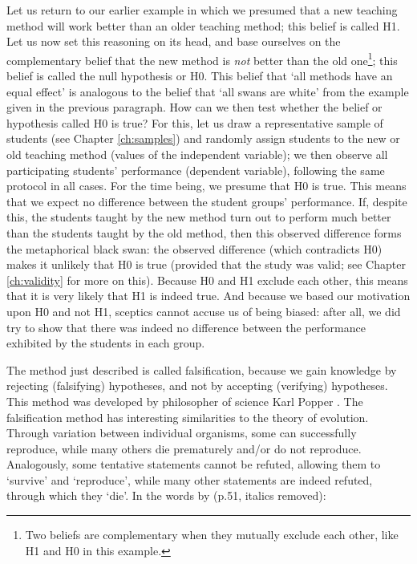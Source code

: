 \documentclass[
]{book}
\begin{document}
Let us return to our earlier example in which we presumed that a new teaching method will work better than an older teaching method; this belief is called H1. Let us now set this reasoning on its head, and base ourselves on the complementary belief that the new method is \emph{not} better than the old one\footnote{Two beliefs are complementary when they mutually exclude each other, like H1 and H0 in this example.}; this belief is called the null hypothesis or H0. This belief that `all methods have an equal effect' is analogous to the belief that `all swans are white' from the example given in the previous paragraph. How can we then test whether the belief or hypothesis called H0 is true? For this, let us draw a representative sample of students (see Chapter \ref{ch:samples}) and randomly assign students to the new or old teaching method (values of the independent variable); we then observe all participating students' performance (dependent variable), following the same protocol in all cases. For the time being, we presume that H0 is true. This means that we expect no difference between the student groups' performance. If, despite this, the students taught by the new method turn out to perform much better than the students taught by the old method, then this observed difference forms the metaphorical black swan: the observed difference (which contradicts H0) makes it unlikely that H0 is true (provided that the study was valid; see Chapter \ref{ch:validity} for more on this). Because H0 and H1 exclude each other, this means that it is very likely that H1 is indeed true. And because we based our motivation upon H0 and not H1, sceptics cannot accuse us of being biased: after all, we did try to show that there was indeed no difference between the performance exhibited by the students in each group.

The method just described is called falsification, because we gain knowledge by rejecting (falsifying) hypotheses, and not by accepting (verifying) hypotheses. This method was developed by philosopher of science Karl Popper \citep{Popp35, Popp59, Popp63}. The falsification method has interesting similarities to the theory of evolution. Through variation between individual organisms, some can successfully reproduce, while many others die prematurely and/or do not reproduce. Analogously, some tentative statements cannot be refuted, allowing them to `survive' and `reproduce', while many other statements are indeed refuted, through which they `die'. In the words by \citet{Popp63} (p.51, italics removed):
\end{document}
